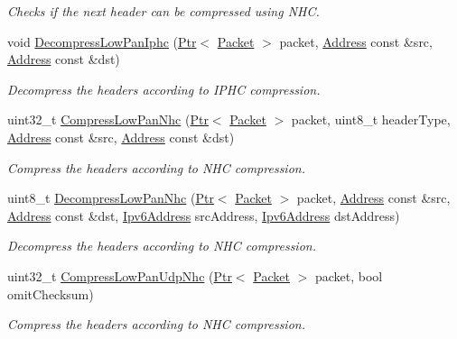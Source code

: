 \begin{DoxyCompactItemize}
\begin{DoxyCompactList}\small\item\em Checks if the next header can be compressed using N\+HC. \end{DoxyCompactList}\item 
void \hyperlink{classns3_1_1SixLowPanNetDevice_ae861be68db1b554cc3e5ea5e263b12ed}{Decompress\+Low\+Pan\+Iphc} (\hyperlink{classns3_1_1Ptr}{Ptr}$<$ \hyperlink{classns3_1_1Packet}{Packet} $>$ packet, \hyperlink{classns3_1_1Address}{Address} const \&src, \hyperlink{classns3_1_1Address}{Address} const \&dst)
\begin{DoxyCompactList}\small\item\em Decompress the headers according to I\+P\+HC compression. \end{DoxyCompactList}\item 
uint32\+\_\+t \hyperlink{classns3_1_1SixLowPanNetDevice_a41d34fd1612e7e6911614fadfef6ab67}{Compress\+Low\+Pan\+Nhc} (\hyperlink{classns3_1_1Ptr}{Ptr}$<$ \hyperlink{classns3_1_1Packet}{Packet} $>$ packet, uint8\+\_\+t header\+Type, \hyperlink{classns3_1_1Address}{Address} const \&src, \hyperlink{classns3_1_1Address}{Address} const \&dst)
\begin{DoxyCompactList}\small\item\em Compress the headers according to N\+HC compression. \end{DoxyCompactList}\item 
uint8\+\_\+t \hyperlink{classns3_1_1SixLowPanNetDevice_af69701425fa2e02ab4a7fdcd1db99cc8}{Decompress\+Low\+Pan\+Nhc} (\hyperlink{classns3_1_1Ptr}{Ptr}$<$ \hyperlink{classns3_1_1Packet}{Packet} $>$ packet, \hyperlink{classns3_1_1Address}{Address} const \&src, \hyperlink{classns3_1_1Address}{Address} const \&dst, \hyperlink{classns3_1_1Ipv6Address}{Ipv6\+Address} src\+Address, \hyperlink{classns3_1_1Ipv6Address}{Ipv6\+Address} dst\+Address)
\begin{DoxyCompactList}\small\item\em Decompress the headers according to N\+HC compression. \end{DoxyCompactList}\item 
uint32\+\_\+t \hyperlink{classns3_1_1SixLowPanNetDevice_aa163cb1c6e2c82e208692f9bae9b5189}{Compress\+Low\+Pan\+Udp\+Nhc} (\hyperlink{classns3_1_1Ptr}{Ptr}$<$ \hyperlink{classns3_1_1Packet}{Packet} $>$ packet, bool omit\+Checksum)
\begin{DoxyCompactList}\small\item\em Compress the headers according to N\+HC compression. \end{DoxyCompactList}\item 

\end{DoxyCompactItemize}
